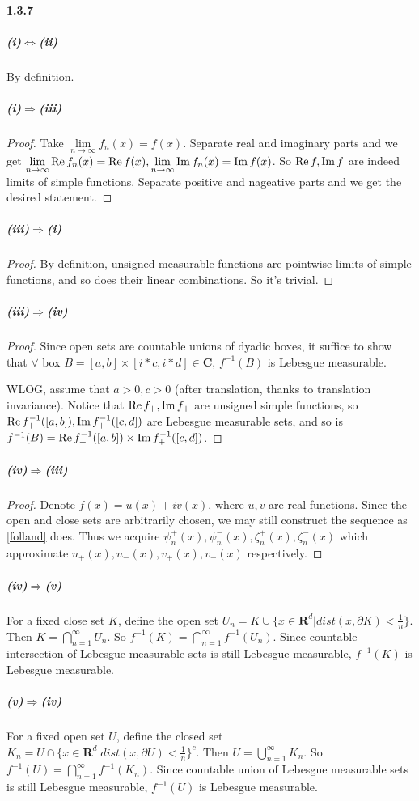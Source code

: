 \documentclass{article}
\begin{document}
\paragraph{1.3.7}
\subparagraph{(i)$\Leftrightarrow$(ii)}By definition.
\subparagraph{(i)$\Rightarrow$(iii)}
\begin{proof}
Take $\lim\limits_{n\to\infty}f_n(x)=f(x)$. Separate real and  imaginary parts and we get $\lim\limits_{n\to\infty}\mathrm{Re}\, f_n(x)=\mathrm{Re}\, f(x), \lim\limits_{n\to\infty} \mathrm{Im}\, f_n(x)=\mathrm{Im}\, f(x)$. So $\mathrm{Re}\, f,\mathrm{Im}\, f$ are indeed limits of simple functions. Separate positive and nageative parts and we get the desired statement.
\end{proof}
\subparagraph{(iii)$\Rightarrow$(i)}
\begin{proof}
By definition, unsigned measurable functions are pointwise limits of simple functions, and so does their linear combinations. So it's trivial.
\end{proof}
\subparagraph{(iii)$\Rightarrow$(iv)}
\begin{proof}
Since open sets are countable unions of dyadic boxes, it suffice to show that $\forall$ box $B=[a,b]\times[i*c,i*d]\in\mathbf{C}$, $f^{-1}(B)$ is Lebesgue measurable. 

WLOG, assume that $a>0,c>0$ (after translation, thanks to translation invariance). Notice that $\mathrm{Re}\, f_+,\mathrm{Im}\, f_+$ are unsigned simple functions, so $\mathrm{Re}\, f_+^{-1}([a,b]),\mathrm{Im}\, f_+^{-1}([c,d])$ are Lebesgue measurable sets, and so is $f^{-1}(B)=\mathrm{Re}\, f_+^{-1}([a,b])\times \mathrm{Im}\, f_+^{-1}([c,d])$.
\end{proof}
\subparagraph{(iv)$\Rightarrow$(iii)}
\begin{proof}
Denote $f(x)=u(x)+iv(x)$, where $u,v$ are real functions. Since the open and close sets are arbitrarily chosen, we may still construct the sequence as \ref{folland} does. Thus we acquire $\psi_n^+(x),\psi_n^-(x),\zeta_n^+(x),\zeta_n^-(x)$ which approximate $u_+(x),u_-(x),v_+(x),v_-(x)$ respectively.
\end{proof}
\subparagraph{(iv)$\Rightarrow$(v)}
For a fixed close set $K$, define the open set $U_n=K\cup \{x\in\mathbf{R}^d|dist(x,\partial K)<\frac{1}{n}\}$. Then $K=\bigcap\limits_{n=1}^{\infty}U_n$. So $f^{-1}(K)=\bigcap\limits_{n=1}^{\infty}f^{-1}(U_n)$. Since countable intersection of Lebesgue measurable sets is still Lebesgue measurable, $f^{-1}(K)$ is Lebesgue measurable.
\subparagraph{(v)$\Rightarrow$(iv)}
For a fixed open set $U$, define the closed set $K_n=U\cap \{x\in\mathbf{R}^d|dist(x,\partial U)<\frac{1}{n}\}^c$. Then $U=\bigcup\limits_{n=1}^{\infty}K_n$. So $f^{-1}(U)=\bigcap\limits_{n=1}^{\infty}f^{-1}(K_n)$. Since countable union of Lebesgue measurable sets is still Lebesgue measurable, $f^{-1}(U)$ is Lebesgue measurable.
\end{document}
